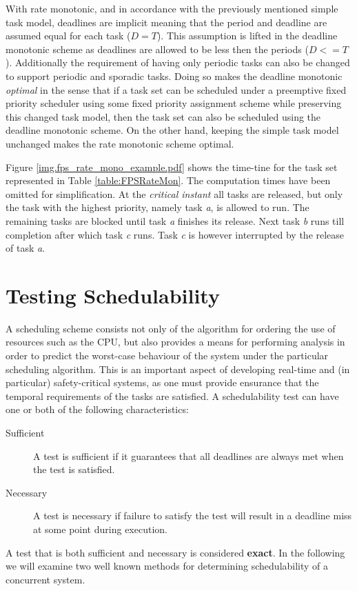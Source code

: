 With rate monotonic, and in accordance with the previously mentioned simple task model, deadlines are implicit meaning that the period and deadline are assumed equal for each task ($D = T$). This assumption is lifted in the deadline monotonic scheme as deadlines are allowed to be less then the periods ($D <= T$). Additionally the requirement of having only periodic tasks can also be changed to support periodic and sporadic tasks. Doing so makes the deadline monotonic \textit{optimal} in the sense that if a task set can be scheduled under a preemptive fixed priority scheduler using some fixed priority assignment scheme while preserving this changed task model, then the task set can also be scheduled using the deadline monotonic scheme. On the other hand, keeping the simple task model unchanged makes the rate monotonic scheme optimal.

Figure \ref{img.fps_rate_mono_example.pdf} shows the time-tine for the task set represented in Table \ref{table:FPSRateMon}. The computation times have been omitted for simplification. At the \textit{critical instant} all tasks are released, but only the task with the highest priority, namely task \textit{a}, is allowed to run. The remaining tasks are blocked until task \textit{a} finishes its release. Next task \textit{b} runs till completion after which task \textit{c} runs. Task \textit{c} is however interrupted by the release of task \textit{a}. 



\section{Testing Schedulability} %
\label{sec:schedulability_analysis}
A scheduling scheme consists not only of the algorithm for ordering the use of resources such as the CPU, but also provides a means for performing analysis in order to predict the worst-case behaviour of the system under the particular scheduling algorithm. This is an important aspect of developing real-time and (in particular) safety-critical systems, as one must provide ensurance that the temporal requirements of the tasks are satisfied. A schedulability test can have one or both of the following characteristics:
\begin{description}
	\item[Sufficient] A test is sufficient if it guarantees that all deadlines are always met when the test is satisfied.
	\item[Necessary] A test is necessary if failure to satisfy the test will result in a deadline miss at some point during execution.
\end{description}
A test that is both sufficient and necessary is considered \textbf{exact}. In the following we will examine two well known methods for determining schedulability of a concurrent system.

